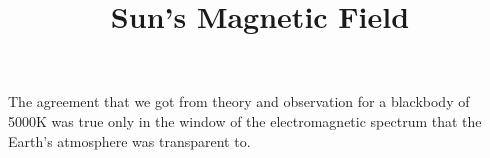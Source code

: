 \documentclass{../template/texnote}
\title{Sun's Magnetic Field}
\begin{document}
    \maketitle {}
The agreement that we got from theory and observation for a blackbody of 5000K was true only in the window of the electromagnetic spectrum that the Earth's atmosphere was transparent to.
    \printbibliography
\end{document}
